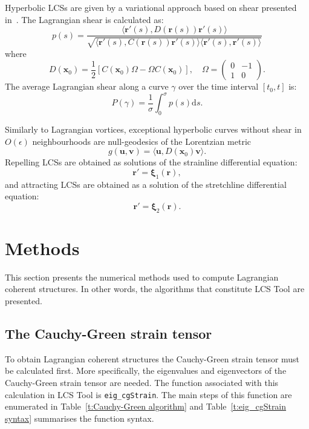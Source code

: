 \documentclass{article}
\begin{document}
Hyperbolic LCSs are given by a variational approach based on shear presented in~\textcite{farazmand13:_shearless}. The Lagrangian shear is calculated as:
\[
p(s) = \frac{\langle \boldsymbol r'(s), D(\boldsymbol r(s)) \boldsymbol r'(s)\rangle}{\sqrt{\langle \boldsymbol r'(s), C(\boldsymbol r(s)) \boldsymbol r'(s)\rangle \langle \boldsymbol r'(s), \boldsymbol r'(s)\rangle}}
\]
where
\[
D(\boldsymbol x_0) = \frac12[C(\boldsymbol x_0) \Omega - \Omega C(\boldsymbol x_0)], \quad \Omega = \begin{pmatrix}0&-1\\1&0\end{pmatrix}.
\]
The average Lagrangian shear along a curve $\gamma$ over the time interval $[t_0,t]$ is:
\[
P(\gamma) = \frac{1}{\sigma} \int_0^\sigma p(s) \text{d}s.
\]

Similarly to Lagrangian vortices, exceptional hyperbolic curves without shear in $O(\epsilon)$ neighbourhoods are null-geodesics of the Lorentzian metric
\[
g(\boldsymbol u, \boldsymbol v) = \langle \boldsymbol u, D(\boldsymbol x_0) \boldsymbol v \rangle.
\]
Repelling LCSs are obtained as solutions of the strainline differential equation:
\[
\boldsymbol r' = \boldsymbol \xi_1(\boldsymbol r),
\]
and attracting LCSs are obtained as a solution of the stretchline differential equation:
\[
\boldsymbol r' = \boldsymbol \xi_2(\boldsymbol r).
\]

\clearpage

\section{Methods}

This section presents the numerical methods used to compute Lagrangian coherent structures. In other words, the algorithms that constitute LCS Tool are presented.

\subsection{The Cauchy-Green strain tensor}

To obtain Lagrangian coherent structures the Cauchy-Green strain tensor must be calculated first. More specifically, the eigenvalues and eigenvectors of the Cauchy-Green strain tensor are needed. The function associated with this calculation in LCS Tool is \lstinline!eig_cgStrain!. The main steps of this function are enumerated in Table~\ref{t:Cauchy-Green algorithm} and Table~\ref{t:eig_cgStrain syntax} summarises the function syntax.
\end{document}
